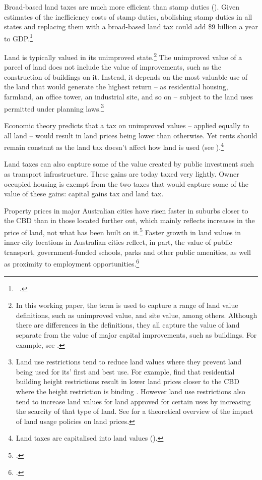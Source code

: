 \documentclass[twoside,english]{Dianab5ona4portrait}
\begin{document}
Broad-based land taxes are much more efficient than stamp duties (). Given estimates of the inefficiency costs of stamp duties, abolishing stamp duties in all states and replacing them with a broad-based land tax could add \$9 billion a year to GDP.\footnote{\gao\ \textcites{KPMGEconotech2011-GST}{ABS2015h}.}

Land is typically valued in its unimproved state.\footnote{In this working paper, the term  is used to capture a range of land value definitions, such as unimproved value, and site value, among others. Although there are differences in the definitions, they all capture the value of land separate from the value of major capital improvements, such as buildings. For example, see \textcite[][153]{HefferanBoyd2010}.}  The unimproved value of a parcel of land does not include the value of improvements, such as the construction of buildings on it. Instead, it depends on the most valuable use of the land that would generate the highest return – as residential housing, farmland, an office tower, an industrial site, and so on – subject to the land uses permitted under planning laws.\footnote{Land use restrictions tend to reduce land values where they prevent land being used for its’ first and best use. For example, \textcite{KulishRichardsGillitzer2011} find that residential building height restrictions result in lower land prices closer to the CBD where the height restriction is binding \textcite[][11]{KulishRichardsGillitzer2011}. However land use restrictions also tend to increase land values for land approved for certain uses by increasing the scarcity of that type of land. See \textcite{Brueckner2007} for a theoretical overview of the impact of land usage policies on land prices.}

Economic theory predicts that a tax on unimproved values – applied equally to all land – would result in land prices being lower than otherwise. Yet rents should remain constant as the land tax doesn’t affect how land is used (see ).\footnote{Land taxes are capitalised into land values (\textcite[][247--248]{HenryTaxReview2010}).}   

Land taxes can also capture some of the value created by public investment such as transport infrastructure. These gains are today taxed very lightly. Owner occupied housing is exempt from the two taxes that would capture some of the value of these gains: capital gains tax and land tax. 

Property prices in major Australian cities have risen faster in suburbs closer to the CBD than in those located further out, which mainly reflects increases in the price of land, not what has been built on it.\footcite[][22]{KulishRichardsGillitzer2011}  Faster growth in land values in inner-city locations in Australian cities reflect, in part, the value of public transport, government-funded schools, parks and other public amenities, as well as proximity to employment opportunities.\footcite[][87]{KellyDonegan2015}
\end{document}
